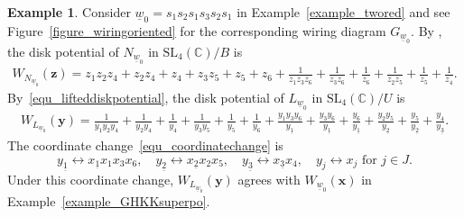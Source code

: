 \documentclass[11pt]{amsart}
\theoremstyle{plain}
\theoremstyle{definition}
\newtheorem{example}[theorem]{Example}
\theoremstyle{remark}
\newcommand{\C}{\mathbb{C}}
\numberwithin{equation}{section} \numberwithin{table}{section}
\numberwithin{equation}{section}
\begin{document}
\begin{example}
Consider $\underline{w}_0 = s_1 s_2 s_1 s_3 s_2 s_1$ in Example~\ref{example_twored} and see Figure~\ref{figure_wiringoriented} for the corresponding wiring diagram $G_{\underline{w}_0}$. By \cite[Corollary 6.14]{CKLP23}, the disk potential of $N_{\underline{w}_0}$ in $\mathrm{SL}_4(\C)/B$ is
{\small
\begin{align*}
W_{N_{\underline{w}_0}}(\mathbf{z}) = z_1z_2z_4 + z_2z_4 + z_4 + z_3 z_5 + z_5 + z_6 + \frac{1}{z_1z_3z_6} + \frac{1}{z_3z_6} + \frac{1}{z_6} + \frac{1}{z_2 z_5} + \frac{1}{z_5} + \frac{1}{z_4}.
\end{align*}
}
By~\eqref{equ_lifteddiskpotential}, the disk potential of $L_{\underline{w}_0}$ in $\mathrm{SL}_4(\C)/U$ is 
{\small
\begin{align*}
W_{L_{\underline{w}_0}}(\mathbf{y}) = \frac{1}{y_1y_2y_4} + \frac{1}{y_2y_4} + \frac{1}{y_4} + \frac{1}{y_3 y_5} + \frac{1}{y_5} + \frac{1}{y_6} + \frac{y_1y_3y_6}{y_{\underline{1}}} + \frac{y_3y_6}{y_{\underline{1}}} + \frac{y_6}{y_{\underline{1}}} + \frac{y_2 y_5}{y_{\underline{2}}} + \frac{y_5}{y_{\underline{2}}} + \frac{y_4}{y_{\underline{3}}}.
\end{align*}
}
The coordinate change~\eqref{equ_coordinatechange} is 
$$
y_{\underline{1}} \leftrightarrow x_{\underline{1}}x_1x_3x_6, \quad y_{\underline{2}} \leftrightarrow x_{\underline{2}}x_2x_5, \quad y_{\underline{3}} \leftrightarrow x_{\underline{3}}x_4, \quad y_j \leftrightarrow x_j \mbox{ for $j \in J$}.
$$
Under this coordinate change,  $W_{L_{\underline{w}_0}}(\mathbf{y})$ agrees with $W_{\underline{w}_0}(\mathbf{x})$ in Example~\ref{example_GHKKsuperpo}.


\end{example}
\end{document}
